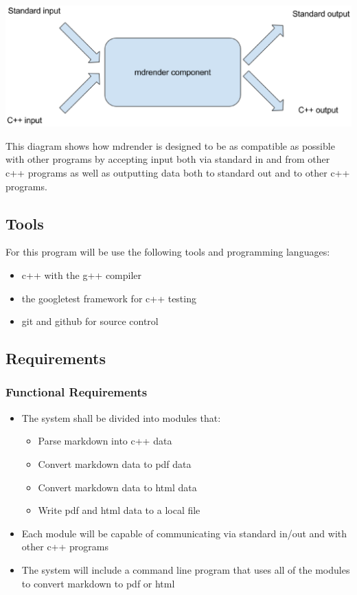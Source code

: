 \includegraphics[width=500pt]{images/mdrender_interactions.eps}

This diagram shows how mdrender is designed to be as compatible as possible with other programs by accepting input both via standard in and from other c++ programs as well as outputting data both to standard out and to other c++ programs.

\subsection{Tools}
For this program will be use the following tools and programming languages:
\begin{itemize}
	\item c++ with the g++ compiler
	\item the googletest framework for c++ testing
	\item git and github for source control
\end{itemize}



\subsection{Requirements}

\subsubsection{Functional Requirements}

\begin{itemize}
	\item The system shall be divided into modules that:
		\begin{itemize}
			\item Parse markdown into c++ data
			\item Convert markdown data to pdf data
			\item Convert markdown data to html data
			\item Write pdf and html data to a local file
		\end{itemize}
	\item Each module will be capable of communicating via standard in/out and with other c++ programs
	\item The system will include a command line program that uses all of the modules to convert markdown to pdf or html
\end{itemize}

